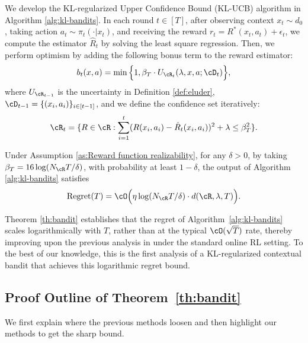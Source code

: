 \documentclass[11pt]{article}
\begin{document}
We develop the KL-regularized Upper Confidence Bound (KL-UCB) algorithm in Algorithm \ref{alg:kl-bandits}. In each round $t\in[T]$, after observing context $x_t\sim d_0$, taking action $a_t\sim\pi_t(\cdot|x_t)$, and receiving the reward $r_t = R^*(x_t, a_t) + \epsilon_t$, we compute the estimator $\hat{R}_t$ by solving the least square regression. Then, we perform optimism by adding the following bonus term to the reward estimator:
\begin{equation}
\label{eq:bonus}
{
\begin{aligned}
    b_t(x,a)= \min\Big\{1,\beta_T \cdot U_{\cR_{t}}(\lambda,x,a;\cD_{t})\Big\},
\end{aligned}}
\end{equation}
where $U_{\cR_{t-1}}$ is the uncertainty in Definition \ref{def:eluder}, $\cD_{t-1}=\{(x_i,a_i)\}_{i\in[t-1]}$, and we define the confidence set iteratively:
$$
\begin{aligned}
    \cR_t=\{R\in\cR: \sum_{i=1}^{t}(R(x_i,a_i)-\hat{R}_t(x_i,a_i))^2+\lambda \le \beta_T^2\}.
\end{aligned}
$$

\begin{theorem}\label{th:bandit}
    Under Assumption \ref{as:Reward function realizability}, for any $\delta>0$, by taking $\beta_T=16\log(N_{\cR}T/\delta)$, with probability at least $1-\delta$, the output of Algorithm \ref{alg:kl-bandits} satisfies
    $$
    \mathrm{Regret}(T) = \cO\Big(\eta\log(N_{\cR}T/\delta)\cdot d(\cR,\lambda,T)\Big).
    $$
\end{theorem}

\begin{remark}
    Theorem \ref{th:bandit} establishes that the regret of Algorithm~\ref{alg:kl-bandits} scales logarithmically with $T$, rather than at the typical $\cO(\sqrt{T})$ rate, thereby improving upon the previous analysis in \citet{xiong2024iterative} under the standard online RL setting. To the best of our knowledge, this is the first analysis of a KL-regularized contextual bandit that achieves this logarithmic regret bound.
\end{remark}

\subsection{Proof Outline of Theorem~\ref{th:bandit}}
We first explain where the previous methods loosen and then highlight our methods to get the sharp bound.
\end{document}
